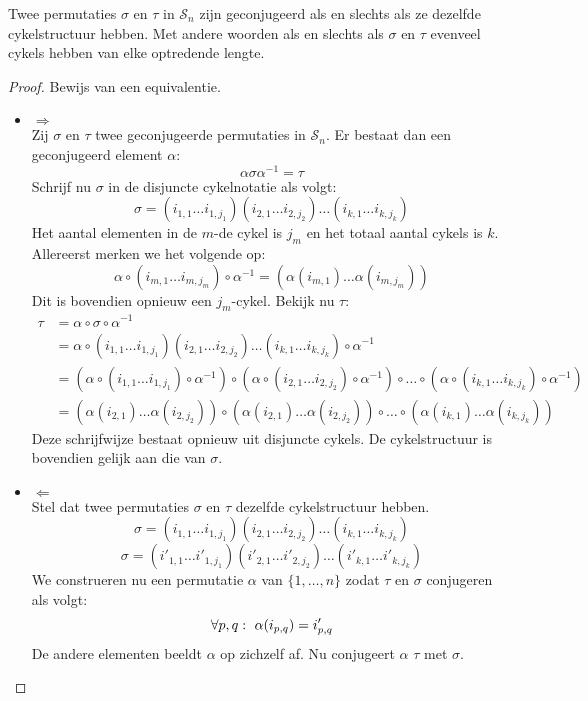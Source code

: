 \documentclass[main.tex]{subfiles}
\begin{document}
\begin{ei}
  Twee permutaties $\sigma$ en $\tau$ in $\mathcal{S}_{n}$ zijn geconjugeerd als en slechts als ze dezelfde cykelstructuur hebben.
  Met andere woorden als en slechts als $\sigma$ en $\tau$ evenveel cykels hebben van elke optredende lengte.
  
  \begin{proof}
    Bewijs van een equivalentie.
    \begin{itemize}
    \item $\Rightarrow$\\
      Zij $\sigma$ en $\tau$ twee geconjugeerde permutaties in $\mathcal{S}_{n}$.
      Er bestaat dan een geconjugeerd element $\alpha$:
      \[ \alpha \sigma \alpha^{-1} = \tau \]
      Schrijf nu $\sigma$ in de disjuncte cykelnotatie als volgt:
      \[ \sigma = (i_{1,1}\dotsc i_{1,j_{1}})(i_{2,1}\dotsc i_{2,j_{2}}) \dotsc (i_{k,1}\dotsc i_{k,j_{k}}) \]
      Het aantal elementen in de $m$-de cykel is $j_{m}$ en het totaal aantal cykels is $k$.
      Allereerst merken we het volgende op:
      \[ \alpha \circ (i_{m,1}\dotsc i_{m,j_{m}}) \circ \alpha^{-1} = (\alpha(i_{m,1})\dotsc\alpha(i_{m,j_{m}})) \]
      Dit is bovendien opnieuw een $j_{m}$-cykel.
      Bekijk nu $\tau$:
      \[ 
      \begin{array}{rl}
      \tau &= \alpha \circ \sigma \circ \alpha^{-1}\\
           &= \alpha \circ (i_{1,1}\dotsc i_{1,j_{1}})(i_{2,1}\dotsc i_{2,j_{2}}) \dotsc (i_{k,1}\dotsc i_{k,j_{k}}) \circ \alpha^{-1}\\
           &= (\alpha \circ (i_{1,1}\dotsc i_{1,j_{1}})\circ \alpha^{-1}) \circ (\alpha \circ(i_{2,1}\dotsc i_{2,j_{2}})\circ \alpha^{-1}) \circ \dotsc \circ (\alpha \circ(i_{k,1}\dotsc i_{k,j_{k}}) \circ \alpha^{-1})\\
           &= (\alpha(i_{2,1})\dotsc\alpha(i_{2,j_{2}})) \circ (\alpha(i_{2,1})\dotsc\alpha(i_{2,j_{2}})) \circ \dotsc \circ (\alpha(i_{k,1})\dotsc\alpha(i_{k,j_{k}}))
      \end{array}
      \]
      Deze schrijfwijze bestaat opnieuw uit disjuncte cykels.
      De cykelstructuur is bovendien gelijk aan die van $\sigma$.
    \item $\Leftarrow$\\
      Stel dat twee permutaties $\sigma$ en $\tau$ dezelfde cykelstructuur hebben.
      \[ \sigma = (i_{1,1}\dotsc i_{1,j_{1}})(i_{2,1}\dotsc i_{2,j_{2}}) \dotsc (i_{k,1}\dotsc i_{k,j_{k}}) \]
      \[ \sigma = (i'_{1,1}\dotsc i'_{1,j_{1}})(i'_{2,1}\dotsc i'_{2,j_{2}}) \dotsc (i'_{k,1}\dotsc i'_{k,j_{k}}) \]
      We construeren nu een permutatie $\alpha$ van $\{ 1,\dotsc,n \}$ zodat $\tau$ en $\sigma$ conjugeren als volgt:
      \[
        \forall p,q:\ \alpha(i_{p,q}) = i'_{p,q}\\
      \]
      De andere elementen beeldt $\alpha$ op zichzelf af.
      Nu conjugeert $\alpha$ $\tau$ met $\sigma$.
    \end{itemize}
  \end{proof}
\end{ei}
\end{document}
